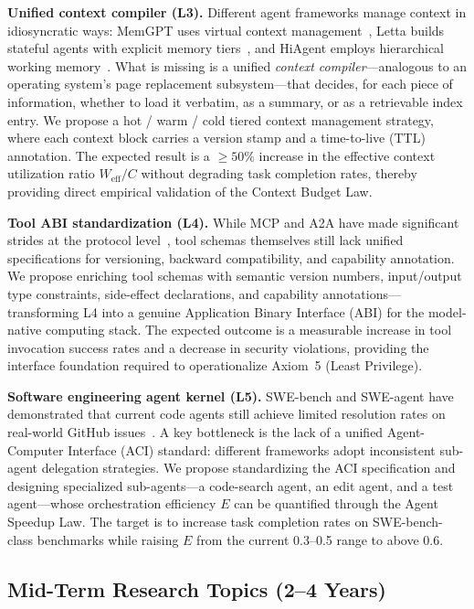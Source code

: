 \documentclass[11pt,a4paper]{article}
\begin{document}
\textbf{Unified context compiler (L3).}
Different agent frameworks manage context in idiosyncratic ways: MemGPT uses virtual context management~\cite{memgpt2023}, Letta builds stateful agents with explicit memory tiers~\cite{letta_stateful_2026}, and HiAgent employs hierarchical working memory~\cite{hiagent2024}.
What is missing is a unified \textit{context compiler}---analogous to an operating system's page replacement subsystem---that decides, for each piece of information, whether to load it verbatim, as a summary, or as a retrievable index entry.
We propose a hot / warm / cold tiered context management strategy, where each context block carries a version stamp and a time-to-live (TTL) annotation.
The expected result is a $\geq 50\%$ increase in the effective context utilization ratio $W_{\mathrm{eff}}/C$ without degrading task completion rates, thereby providing direct empirical validation of the Context Budget Law.

\textbf{Tool ABI standardization (L4).}
While MCP and A2A have made significant strides at the protocol level~\cite{mcp_intro_2026,agentprotocols2025}, tool schemas themselves still lack unified specifications for versioning, backward compatibility, and capability annotation.
We propose enriching tool schemas with semantic version numbers, input/output type constraints, side-effect declarations, and capability annotations---transforming L4 into a genuine Application Binary Interface (ABI) for the model-native computing stack.
The expected outcome is a measurable increase in tool invocation success rates and a decrease in security violations, providing the interface foundation required to operationalize Axiom~5 (Least Privilege).

\textbf{Software engineering agent kernel (L5).}
SWE-bench and SWE-agent have demonstrated that current code agents still achieve limited resolution rates on real-world GitHub issues~\cite{swebench2023,sweagent2024}.
A key bottleneck is the lack of a unified Agent-Computer Interface (ACI) standard: different frameworks adopt inconsistent sub-agent delegation strategies.
We propose standardizing the ACI specification and designing specialized sub-agents---a code-search agent, an edit agent, and a test agent---whose orchestration efficiency $E$ can be quantified through the Agent Speedup Law.
The target is to increase task completion rates on SWE-bench-class benchmarks while raising $E$ from the current 0.3--0.5 range to above 0.6.

\subsection{Mid-Term Research Topics (2--4 Years)}
\end{document}
